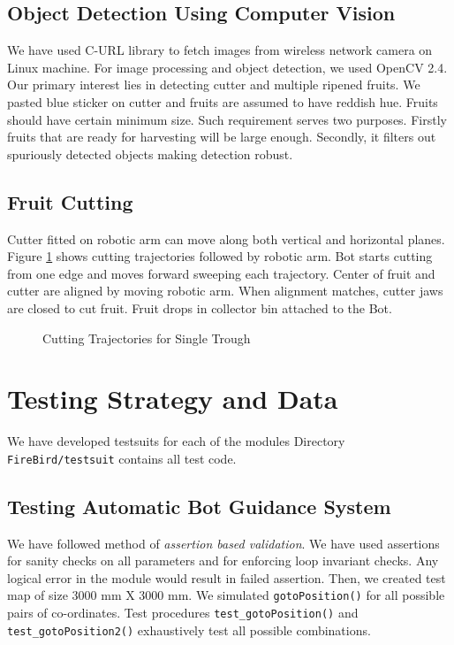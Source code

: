\documentclass[a4paper, 12pt]{article}
\begin{document}
\subsection{Object Detection Using Computer Vision}
We have used C-URL library to fetch images from wireless network camera on Linux machine. For image
processing and object detection, we used OpenCV 2.4. Our primary interest lies in detecting cutter and multiple 
ripened fruits. We pasted blue sticker on cutter and fruits are assumed to have reddish hue. Fruits should
have certain minimum size. Such requirement serves two purposes. Firstly fruits that are ready for harvesting
will be large enough. Secondly, it filters out spuriously detected objects making detection robust.

\subsection{Fruit Cutting}
Cutter fitted on robotic arm can move along both vertical and horizontal planes. Figure \ref{fig-traj} shows
cutting trajectories followed by robotic arm. Bot starts cutting from one edge and moves forward sweeping
each trajectory. Center of fruit and cutter are aligned by moving robotic arm. When alignment matches,
cutter jaws are closed to cut fruit. Fruit drops in collector bin attached to the Bot. 

\begin{figure}
 
 \caption{Cutting Trajectories for Single Trough}
 \label{fig-traj}
\end{figure}


\section{Testing Strategy and Data}
 We have developed testsuits for each of the modules Directory \texttt{FireBird/testsuit} contains all test code.
 \subsection{Testing Automatic Bot Guidance System}
 We have followed method of \emph{assertion based validation}. We have used assertions for sanity checks on all
 parameters and for enforcing loop invariant checks. Any logical error in the module would result in failed assertion. 
 Then, we created test map of size 3000 mm X 3000 mm. We simulated \texttt{gotoPosition()} for all possible pairs
 of co-ordinates. Test procedures \texttt{test\_gotoPosition()} and \texttt{test\_gotoPosition2()} exhaustively 
 test all possible combinations.
 
\end{document}
